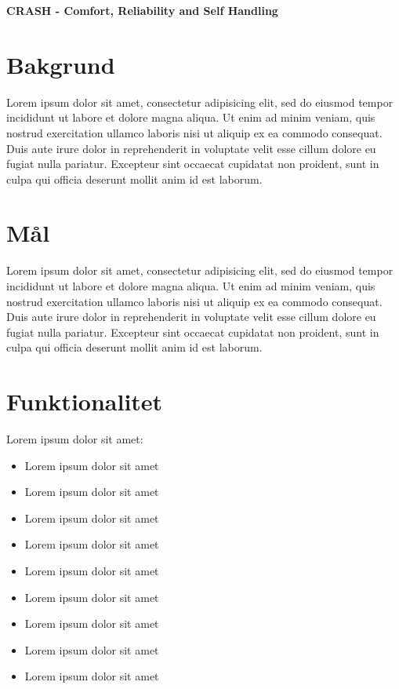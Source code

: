 \documentclass[10pt]{article}
\date{}
\begin{document}

\begin{center}
{\Large
\textbf{CRASH - Comfort, Reliability and Self Handling}
}
\end{center}


\tableofcontents
\newpage

\section{Bakgrund}
\sloppy
\noindent Lorem ipsum dolor sit amet, consectetur adipisicing elit, sed do eiusmod tempor incididunt ut labore et dolore magna aliqua. Ut enim ad minim veniam, quis nostrud exercitation ullamco laboris nisi ut aliquip ex ea commodo consequat. Duis aute irure dolor in reprehenderit in voluptate velit esse cillum dolore eu fugiat nulla pariatur. Excepteur sint occaecat cupidatat non proident, sunt in culpa qui officia deserunt mollit anim id est laborum.

\section{Mål}
\sloppy
\noindent Lorem ipsum dolor sit amet, consectetur adipisicing elit, sed do eiusmod tempor incididunt ut labore et dolore magna aliqua. Ut enim ad minim veniam, quis nostrud exercitation ullamco laboris nisi ut aliquip ex ea commodo consequat. Duis aute irure dolor in reprehenderit in voluptate velit esse cillum dolore eu fugiat nulla pariatur. Excepteur sint occaecat cupidatat non proident, sunt in culpa qui officia deserunt mollit anim id est laborum.

\section{Funktionalitet}
\sloppy
\noindent Lorem ipsum dolor sit amet: 
\begin{itemize}
	\setlength\itemsep{0.1em}
	\item Lorem ipsum dolor sit amet
	\item Lorem ipsum dolor sit amet
	\item Lorem ipsum dolor sit amet
	\item Lorem ipsum dolor sit amet
	\item Lorem ipsum dolor sit amet
	\item Lorem ipsum dolor sit amet
	\item Lorem ipsum dolor sit amet
	\item Lorem ipsum dolor sit amet
	\item Lorem ipsum dolor sit amet
\end{itemize}
\end{document}
